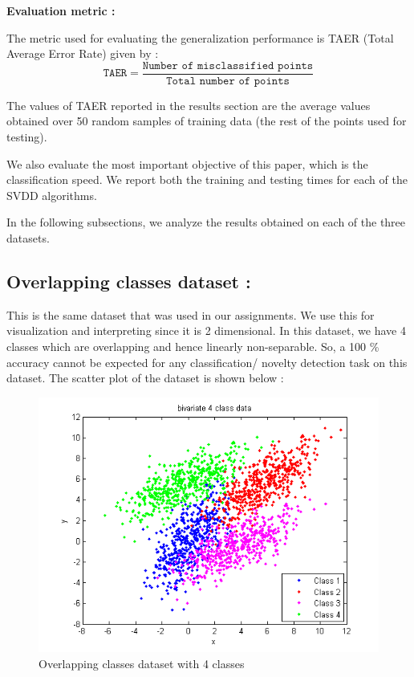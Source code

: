 \documentclass{article} %
\begin{document}
\textbf{Evaluation metric :}

The metric used for evaluating the generalization performance is  TAER (Total Average Error Rate) given by :
\[ \texttt{TAER} = \frac{\texttt{Number of misclassified points}}{\texttt{Total number of points}} \]

The values of TAER reported in the results section are the average values obtained over 50 random samples of training data (the rest of the points used for testing). 

We also evaluate the most important objective of this paper, which is the classification speed. We report both the training and testing times for each of the SVDD algorithms.

In the following subsections, we analyze the results obtained on each of the three datasets. \\[10pt]



\subsection{Overlapping classes dataset :} This is the same dataset that was used in our assignments. We use this for visualization and interpreting since it is 2 dimensional. In this dataset, we have 4 classes which are overlapping and hence linearly non-separable. So, a 100 \% accuracy cannot be expected for any classification/ novelty detection task on this dataset.
The scatter plot of the dataset is shown below :

\begin{figure}
  \centering
  \includegraphics[width=\linewidth]{../Code/overlapping/svdd/data}
  \caption{Overlapping classes dataset with 4 classes}
\end{figure}
\end{document}

